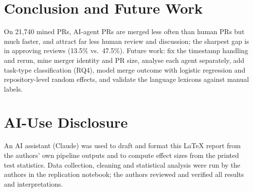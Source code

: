 \documentclass[conference]{IEEEtran}
\begin{document}
\section{Conclusion and Future Work}
On 21{,}740 mined PRs, AI-agent PRs are merged less often than human PRs but much faster, and attract far less human review and discussion; the sharpest gap is in approving reviews (13.5\% vs.\ 47.5\%). Future work: fix the timestamp handling and rerun, mine merger identity and PR size, analyse each agent separately, add task-type classification (RQ4), model merge outcome with logistic regression and repository-level random effects, and validate the language lexicons against manual labels.

\section*{AI-Use Disclosure}
An AI assistant (Claude) was used to draft and format this LaTeX report from the authors' own pipeline outputs and to compute effect sizes from the printed test statistics. Data collection, cleaning and statistical analysis were run by the authors in the replication notebook; the authors reviewed and verified all results and interpretations.
\end{document}
